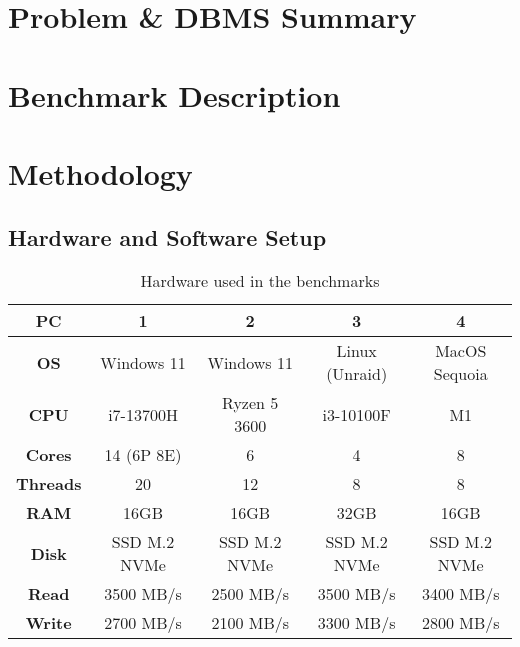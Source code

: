 \section{Problem \& DBMS Summary}
\label{sec:problem}

\section{Benchmark Description}
\label{sec:benchmark}

\section{Methodology}
\label{sec:methodology}

\pagebreak

\subsection{Hardware and Software Setup}
\label{sec:hardware-software-setup}

\begin{table}[h!]
    \centering
    \begin{tabular}{|c|c|c|c|c|}
        \hline
        \textbf{PC}      & \textbf{1}   & \textbf{2}   & \textbf{3}     & \textbf{4}    \\
        \hline
        \textbf{OS}      & Windows 11   & Windows 11   & Linux (Unraid) & MacOS Sequoia \\
        \hline
        \textbf{CPU}     & i7-13700H    & Ryzen 5 3600 & i3-10100F      & M1            \\
        \hline
        \textbf{Cores}   & 14 (6P 8E)   & 6            & 4              & 8             \\
        \hline
        \textbf{Threads} & 20           & 12           & 8              & 8             \\
        \hline
        \textbf{RAM}     & 16GB         & 16GB         & 32GB           & 16GB          \\
        \hline
        \textbf{Disk}    & SSD M.2 NVMe & SSD M.2 NVMe & SSD M.2 NVMe   & SSD M.2 NVMe  \\
        \hline
        \textbf{Read}    & 3500 MB/s    & 2500 MB/s    & 3500 MB/s      & 3400 MB/s     \\
        \hline
        \textbf{Write}   & 2700 MB/s    & 2100 MB/s    & 3300 MB/s      & 2800 MB/s     \\
        \hline
    \end{tabular}
    \caption{Hardware used in the benchmarks}
    \label{tab:hardware-setup}
\end{table}

